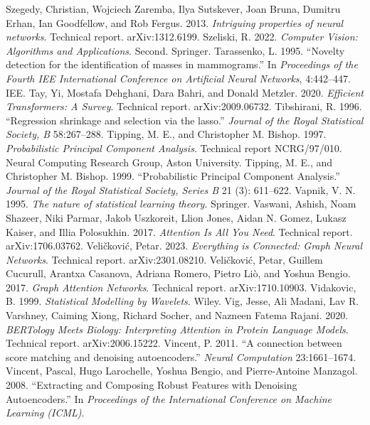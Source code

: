  Szegedy, Christian, Wojciech Zaremba, Ilya Sutskever, Joan Bruna, Dumitru Erhan, Ian Goodfellow, and Rob Fergus. 2013. \emph{Intriguing properties of neural networks}. Technical report. arXiv:1312.6199.
 Szeliski, R. 2022. \emph{Computer Vision: Algorithms and Applications}. Second. Springer.
 Tarassenko, L. 1995. ``Novelty detection for the identification of masses in mammograms.'' In \emph{Proceedings of the Fourth IEE International Conference on Artificial Neural Networks}, 4:442--447. IEE.
 Tay, Yi, Mostafa Dehghani, Dara Bahri, and Donald Metzler. 2020. \emph{Efficient Transformers: A Survey}. Technical report. arXiv:2009.06732.
 Tibshirani, R. 1996. ``Regression shrinkage and selection via the lasso.'' \emph{Journal of the Royal Statistical Society, B} 58:267--288.
 Tipping, M. E., and Christopher M. Bishop. 1997. \emph{Probabilistic Principal Component Analysis}. Technical report NCRG/97/010. Neural Computing Research Group, Aston University.
 Tipping, M. E., and Christopher M. Bishop. 1999. ``Probabilistic Principal Component Analysis.'' \emph{Journal of the Royal Statistical Society, Series B} 21 (3): 611--622.
 Vapnik, V. N. 1995. \emph{The nature of statistical learning theory}. Springer.
 Vaswani, Ashish, Noam Shazeer, Niki Parmar, Jakob Uszkoreit, Llion Jones, Aidan N. Gomez, Lukasz Kaiser, and Illia Polosukhin. 2017. \emph{Attention Is All You Need}. Technical report. arXiv:1706.03762.
 Veličković, Petar. 2023. \emph{Everything is Connected: Graph Neural Networks}. Technical report. arXiv:2301.08210.
 Veličković, Petar, Guillem Cucurull, Arantxa Casanova, Adriana Romero, Pietro Liò, and Yoshua Bengio. 2017. \emph{Graph Attention Networks}. Technical report. arXiv:1710.10903.
 Vidakovic, B. 1999. \emph{Statistical Modelling by Wavelets}. Wiley.
 Vig, Jesse, Ali Madani, Lav R. Varshney, Caiming Xiong, Richard Socher, and Nazneen Fatema Rajani. 2020. \emph{BERTology Meets Biology: Interpreting Attention in Protein Language Models}. Technical report. arXiv:2006.15222.
 Vincent, P. 2011. ``A connection between score matching and denoising autoencoders.'' \emph{Neural Computation} 23:1661--1674.
 Vincent, Pascal, Hugo Larochelle, Yoshua Bengio, and Pierre-Antoine Manzagol. 2008. ``Extracting and Composing Robust Features with Denoising Autoencoders.'' In \emph{Proceedings of the International Conference on Machine Learning (ICML)}.
